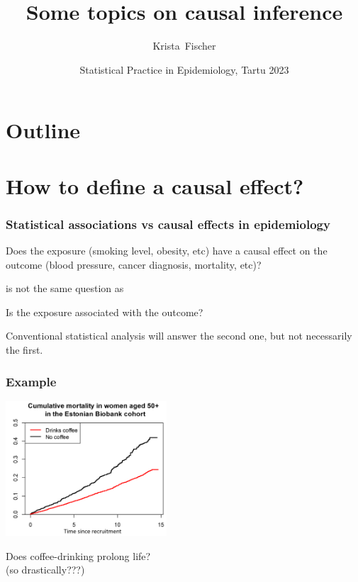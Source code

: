 \documentclass[10pt,dvipsnames,t,handout%
,aspectratio=169%
]{beamer}%
\title{Some topics on causal inference}
\author{Krista~Fischer}
\institute[TY] %
{
  Institute of Mathematics and Statistics, University of Tartu \\
    Institute of Genomics, University of Tartu \\
   Estonian Academy of Sciences
}
\date[Tartu 2019] %
{Statistical Practice in Epidemiology, Tartu 2023}
\begin{document}
\begin{frame}
  \titlepage
\end{frame}

\section*{Outline}
\begin{frame}
\tableofcontents
\end{frame}

\section{How to define a causal effect?}

\begin{frame}
  \frametitle{Statistical associations vs causal effects in epidemiology}
  \begin{block}{}
  Does the exposure (smoking level, obesity, etc) have a \alert<2>{causal effect} on the outcome (blood pressure, cancer diagnosis, mortality, etc)?
  \end{block}
is not the same question as   
 \begin{block}{}
  Is the exposure \alert<3>{associated} with the outcome?
  \end{block}
 Conventional statistical analysis will answer the second one, but not necessarily the first. 
\end{frame}

\begin{frame}
	\frametitle{Example}
\includegraphics[width=6cm]{kohv_egv_1} \\
\begin{block}{}
Does coffee-drinking prolong life? \\
(so drastically???)
\end{block}
\end{frame}
\end{document}

